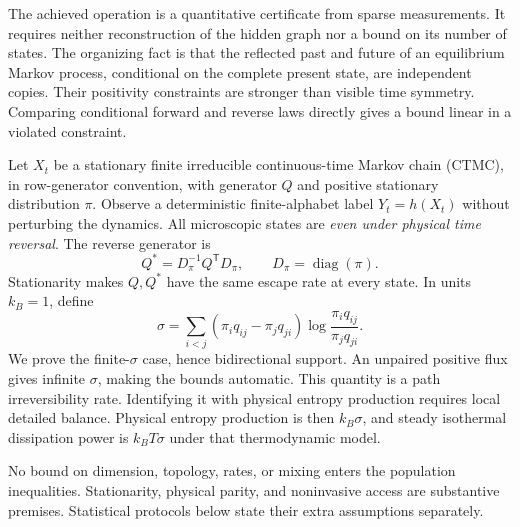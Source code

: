 \documentclass[11pt,a4paper]{article}
\begin{document}
The achieved operation is a quantitative certificate from sparse measurements. It requires neither reconstruction of the hidden graph nor a bound on its number of states. The organizing fact is that the reflected past and future of an equilibrium Markov process, conditional on the complete present state, are independent copies. Their positivity constraints are stronger than visible time symmetry. Comparing conditional forward and reverse laws directly gives a bound linear in a violated constraint.

Let $X_t$ be a stationary finite irreducible continuous-time Markov chain (CTMC), in row-generator convention, with generator $Q$ and positive stationary distribution $\pi$. Observe a deterministic finite-alphabet label $Y_t=h(X_t)$ without perturbing the dynamics. All microscopic states are \emph{even under physical time reversal}. The reverse generator is
\[
Q^*=D_\pi^{-1}Q^{\mathsf T}D_\pi,\qquad D_\pi=\operatorname{diag}(\pi).
\]
Stationarity makes $Q,Q^*$ have the same escape rate at every state. In units $k_B=1$, define
\begin{equation}\label{eq:sigma}
\sigma=\sum_{i<j}(\pi_iq_{ij}-\pi_jq_{ji})\log\frac{\pi_iq_{ij}}{\pi_jq_{ji}}.
\end{equation}
We prove the finite-$\sigma$ case, hence bidirectional support. An unpaired positive flux gives infinite $\sigma$, making the bounds automatic. This quantity is a path irreversibility rate. Identifying it with physical entropy production requires local detailed balance. Physical entropy production is then $k_B\sigma$, and steady isothermal dissipation power is $k_BT\sigma$ under that thermodynamic model.

No bound on dimension, topology, rates, or mixing enters the population inequalities. Stationarity, physical parity, and noninvasive access are substantive premises. Statistical protocols below state their extra assumptions separately.
\end{document}

